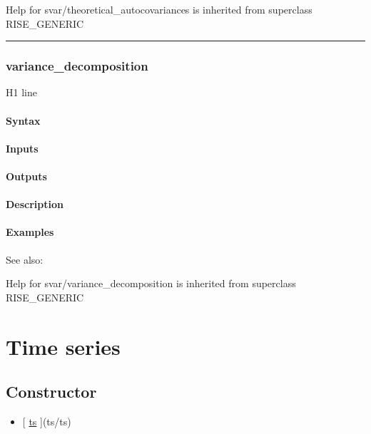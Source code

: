 \documentclass[letterpaper,10pt,english]{sphinxmanual}
\begin{document}
Help for svar/theoretical\_autocovariances is inherited from superclass RISE\_GENERIC


\bigskip\hrule{}\bigskip



\subsection{variance\_decomposition}
\label{classes/models/@svar/svar:variance-decomposition}\label{classes/models/@svar/svar:id151}
H1 line


\subsubsection{Syntax}
\label{classes/models/@svar/svar:id152}

\subsubsection{Inputs}
\label{classes/models/@svar/svar:id153}

\subsubsection{Outputs}
\label{classes/models/@svar/svar:id154}

\subsubsection{Description}
\label{classes/models/@svar/svar:id155}

\subsubsection{Examples}
\label{classes/models/@svar/svar:id156}
See also:

Help for svar/variance\_decomposition is inherited from superclass RISE\_GENERIC


\chapter{Time series}
\label{classes/time_series/@ts/ts:time-series}\label{classes/time_series/@ts/ts::doc}

\section{Constructor}
\label{classes/time_series/@ts/ts:constructor}\begin{itemize}
\item {} 
{[} {\hyperref[classes/time_series/@ts/ts:ts]{ts}} {]}(ts/ts)

\end{itemize}
\end{document}
